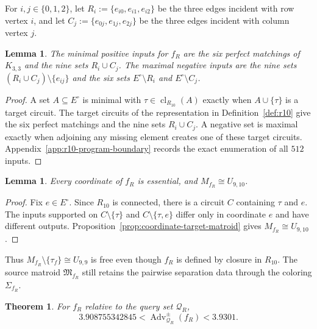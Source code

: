 \documentclass[11pt]{article}
\numberwithin{equation}{section}
\newtheorem{theorem}[definition]{Theorem}
\newtheorem{lemma}[definition]{Lemma}
\theoremstyle{remark}
\newcommand{\cl}{\operatorname{cl}}
\begin{document}
For $i,j\in\{0,1,2\}$, let
$R_i:=\{e_{i0},e_{i1},e_{i2}\}$ be the three edges incident with row
vertex $i$, and let $C_j:=\{e_{0j},e_{1j},e_{2j}\}$ be the three edges
incident with column vertex $j$.

\begin{lemma}
\label{lem:r10-minimal-positive}
\label{lem:r10-boundary-inputs}
The minimal positive inputs for $f_R$ are the six perfect matchings of
$K_{3,3}$ and the nine sets $R_i\cup C_j$. The maximal negative
inputs are the nine sets $(R_i\cup C_j)\setminus\{e_{ij}\}$ and the six sets
$E^\circ\setminus R_i$ and $E^\circ\setminus C_j$.
\end{lemma}

\begin{proof}
A set $A\subseteq E^\circ$ is minimal with
$\tau\in\cl_{R_{10}}(A)$ exactly when $A\cup\{\tau\}$ is a target circuit.
The target circuits of the representation in Definition~\ref{def:r10} give
the six perfect matchings and the nine sets $R_i\cup C_j$. A negative set is maximal
exactly when adjoining any missing element creates one of these target
circuits. Appendix~\ref{app:r10-program-boundary} records the exact
enumeration of all $512$ inputs.
\end{proof}

\begin{lemma}
\label{lem:r10-targeted-query-matroid}
Every coordinate of $f_R$ is essential, and $M_{f_R}\cong U_{9,10}$.
\end{lemma}

\begin{proof}
Fix $e\in E^\circ$. Since $R_{10}$ is connected, there is a circuit $C$
containing $\tau$ and $e$. The inputs supported on
$C\setminus\{\tau\}$ and $C\setminus\{\tau,e\}$ differ only in coordinate
$e$ and have different outputs. Proposition~\ref{prop:coordinate-target-matroid}
gives $M_{f_R}\cong U_{9,10}$.
\end{proof}

Thus $M_{f_R}\setminus\{\tau_f\}\cong U_{9,9}$ is free even though
$f_R$ is defined by closure in $R_{10}$. The source matroid
$\mathfrak M_{f_R}$ still retains the pairwise separation data through the
coloring $\Sigma_{f_R}$.

\begin{theorem}
\label{thm:r10-source-interval}
For $f_R$ relative to the query set $\mathcal Q_R$,
\begin{equation}
\label{eq:r10-adversary-interval}
    3.908755342845
    <
    \operatorname{Adv}^{\pm}_{\mathcal Q_R}(f_R)
    <
    3.9301.
\end{equation}
\end{theorem}
\end{document}
